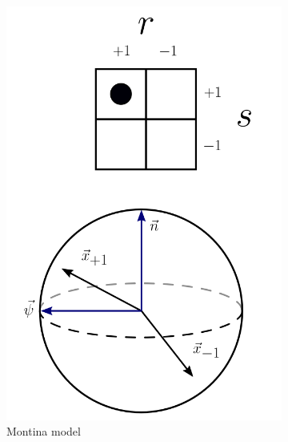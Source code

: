 \documentclass[%
 reprint, onecolumn, 12pt,
superscriptaddress,
nofootinbib,
 prx, 
]{quantumarticle}
\begin{document}
\begin{figure}[t]
\begin{subfigure}[t]{0.24\textwidth}
 \includegraphics[width=\textwidth]{Montina_model_v2.png}
 \caption{Montina model}
 \label{fig:Montmodel}
 \end{subfigure}
 \begin{subfigure}[t]{0.24\textwidth}

\end{subfigure}
\end{figure}
\end{document}
